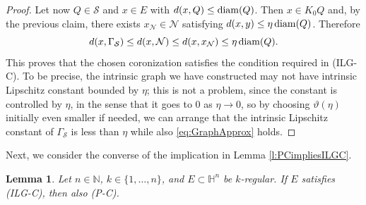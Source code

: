 \documentclass[12pt]{amsart}
\newcommand{\diam}{{\rm diam}}
\renewcommand{\theta}{\vartheta}
\numberwithin{equation}{section}
\theoremstyle{plain}
\newtheorem{lemma}[theorem]{Lemma}
\theoremstyle{definition}
\theoremstyle{remark}
\begin{document}
\begin{proof}
Let now $Q\in\mathcal S$ and $x\in E$ with $d(x,Q)\leq \diam(Q)$. Then $x\in K_0 Q$ and, by the previous claim, there exists $x_\mathcal N\in\mathcal N$ satisfying $d(x,y)\leq \eta\,\diam(Q)$. Therefore
\begin{equation}\label{eq:GraphApprox}d(x,\Gamma_{\mathcal{S}})\leq d(x,\mathcal N)\leq d(x,x_\mathcal N)\leq \eta \,\diam(Q).\end{equation}
This proves that the chosen coronization satisfies the condition required in (ILG-C). To be precise, the intrinsic graph we have constructed may not have intrinsic Lipschitz constant bounded by $\eta$; this is not a problem, since the constant is controlled by $\eta$, in the sense that it goes to $0$ as $\eta \to 0$, so by choosing $\theta(\eta)$ initially even smaller if needed, we can arrange that the intrinsic Lipschitz constant of $\Gamma_{\mathcal{S}}$ is less than $\eta$ while also \eqref{eq:GraphApprox} holds.
\end{proof}

Next, we consider the converse of the implication in Lemma \ref{l:PCimpliesILGC}.

\begin{lemma}\label{lem_equivcor} Let $n\in \mathbb{N}$, $k\in \{1,\ldots,n\}$, and $E\subset \mathbb{H}^n$ be $k$-regular. If $E$ satisfies  (ILG-C), then also (P-C).    
\end{lemma}
\end{document}
